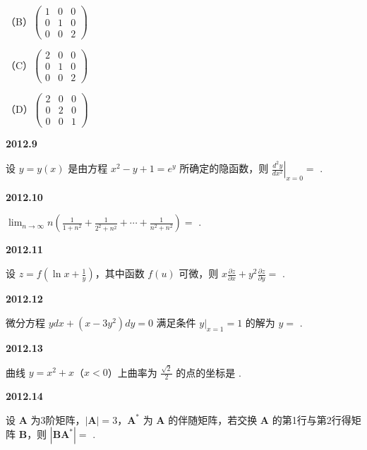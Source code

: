 \documentclass[UTF8,12pt,fontset=windows]{ctexart}
\begin{document}
（B）$\begin{pmatrix} 1 & 0 & 0 \\ 0 & 1 & 0 \\ 0 & 0 & 2 \end{pmatrix}$

（C）$\begin{pmatrix} 2 & 0 & 0 \\ 0 & 1 & 0 \\ 0 & 0 & 2 \end{pmatrix}$

（D）$\begin{pmatrix} 2 & 0 & 0 \\ 0 & 2 & 0 \\ 0 & 0 & 1 \end{pmatrix}$

\vfill
\newpage
{\large\bfseries 2012.9}

设 $y = y(x)$ 是由方程 $x^2 - y + 1 = e^y$ 所确定的隐函数，则 $\left.\frac{d^2y}{dx^2}\right|_{x = 0} =$ \underline{\hspace{20mm}}.

\vfill
\newpage
{\large\bfseries 2012.10}

$\lim_{n \to \infty}n\left(\frac{1}{1 + n^2} + \frac{1}{2^2 + n^2} + \cdots + \frac{1}{n^2 + n^2}\right) =$ \underline{\hspace{20mm}}.

\vfill
\newpage
{\large\bfseries 2012.11}

设 $z = f\left(\ln x + \frac{1}{y}\right)$，其中函数 $f(u)$ 可微，则 $x\frac{\partial z}{\partial x} + y^2\frac{\partial z}{\partial y} =$ \underline{\hspace{20mm}}.

\vfill
\newpage
{\large\bfseries 2012.12}

微分方程 $y dx + (x - 3y^2)dy = 0$ 满足条件 $y|_{x = 1} = 1$ 的解为 $y =$ \underline{\hspace{20mm}}.

\vfill
\newpage
{\large\bfseries 2012.13}

曲线 $y = x^2 + x$（$x < 0$）上曲率为 $\frac{\sqrt{2}}{2}$ 的点的坐标是 \underline{\hspace{20mm}}.

\vfill
\newpage
{\large\bfseries 2012.14}

设 $\boldsymbol{A}$ 为3阶矩阵，$|\boldsymbol{A}| = 3$，$\boldsymbol{A}^*$ 为 $\boldsymbol{A}$ 的伴随矩阵，若交换 $\boldsymbol{A}$ 的第1行与第2行得矩阵 $\boldsymbol{B}$，则 $|\boldsymbol{BA}^*| =$ \underline{\hspace{20mm}}.
\end{document}
